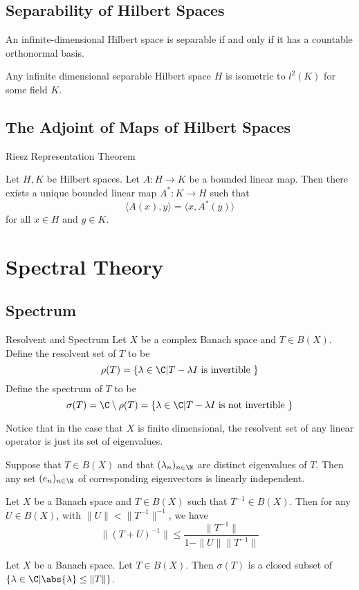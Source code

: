 \documentclass[a4paper]{article}
\begin{document}
\subsection{Separability of Hilbert Spaces}
\begin{prp}{}{} An infinite-dimensional Hilbert space is separable if and only if it has a countable orthonormal basis. 
\end{prp}

\begin{thm}{}{} Any infinite dimensional separable Hilbert space $H$ is isometric to $l^2(K)$ for some field $K$. 
\end{thm}

\subsection{The Adjoint of Maps of Hilbert Spaces}
\begin{thm}{Riesz Representation Theorem}{}
\end{thm}

\begin{thm}{}{} Let $H,K$ be Hilbert spaces. Let $A:H\to K$ be a bounded linear map. Then there exists a unique bounded linear map $A^\ast:K\to H$ such that $$\langle A(x),y\rangle=\langle x,A^\ast(y)\rangle$$ for all $x\in H$ and $y\in K$. 
\end{thm}

\pagebreak
\section{Spectral Theory}
\subsection{Spectrum}
\begin{defn}{Resolvent and Spectrum}{} Let $X$ be a complex Banach space and $T\in B(X)$. Define the resolvent set of $T$ to be $$\rho(T)=\{\lambda\in\C|T-\lambda I\text{ is invertible }\}$$ Define the spectrum of $T$ to be $$\sigma(T)=\C\setminus\rho(T)=\{\lambda\in\C|T-\lambda I\text{ is not invertible }\}$$
\end{defn}

Notice that in the case that $X$ is finite dimensional, the resolvent set of any linear operator is just its set of eigenvalues. 

\begin{lmm}{}{} Suppose that $T\in B(X)$ and that $(\lambda_n)_{n\in\N}$ are distinct eigenvalues of $T$. Then any set $(e_n)_{n\in\N}$ of corresponding eigenvectors is linearly independent. 
\end{lmm}

\begin{thm}{}{} Let $X$ be a Banach space and $T\in B(X)$ such that $T^{-1}\in B(X)$. Then for any $U\in B(X)$, with $\|U\|<\|T^{-1}\|^{-1}$, we have $$\|(T+U)^{-1}\|\leq\frac{\|T^{-1}\|}{1-\|U\|\|T^{-1}\|}$$
\end{thm}

\begin{lmm}{}{} Let $X$ be a Banach space. Let $T\in B(X)$. Then $\sigma(T)$ is a closed subset of $\{\lambda\in\C|\abs{\lambda}\leq\|T\|\}$. 
\end{lmm}
\end{document}
